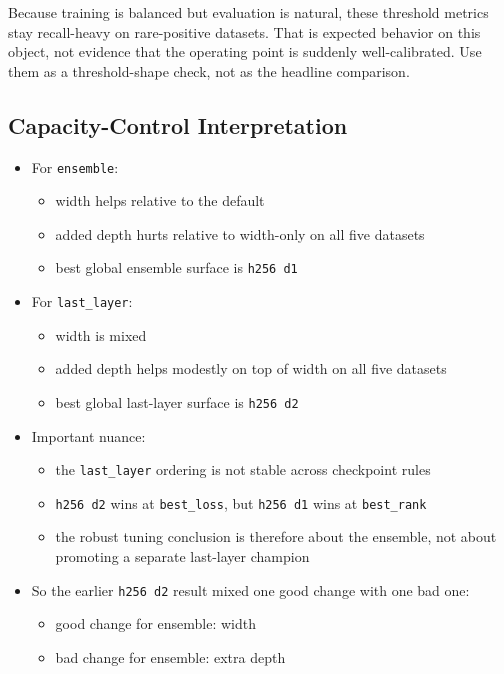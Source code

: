 \documentclass[11pt]{article}
\begin{document}
Because training is balanced but evaluation is natural, these threshold metrics stay recall-heavy on rare-positive datasets. That is expected behavior on this object, not evidence that the operating point is suddenly well-calibrated. Use them as a threshold-shape check, not as the headline comparison.

\subsection*{Capacity-Control Interpretation}
\begin{itemize}[leftmargin=1.5em]
\item For \texttt{ensemble}:
  \begin{itemize}[leftmargin=1.5em]
  \item width helps relative to the default
  \item added depth hurts relative to width-only on all five datasets
  \item best global ensemble surface is \texttt{h256 d1}
  \end{itemize}
\item For \texttt{last\_layer}:
  \begin{itemize}[leftmargin=1.5em]
  \item width is mixed
  \item added depth helps modestly on top of width on all five datasets
  \item best global last-layer surface is \texttt{h256 d2}
  \end{itemize}
\item Important nuance:
  \begin{itemize}[leftmargin=1.5em]
  \item the \texttt{last\_layer} ordering is not stable across checkpoint rules
  \item \texttt{h256 d2} wins at \texttt{best\_loss}, but \texttt{h256 d1} wins at \texttt{best\_rank}
  \item the robust tuning conclusion is therefore about the ensemble, not about promoting a separate last-layer champion
  \end{itemize}
\item So the earlier \texttt{h256 d2} result mixed one good change with one bad one:
  \begin{itemize}[leftmargin=1.5em]
  \item good change for ensemble: width
  \item bad change for ensemble: extra depth
  \end{itemize}
\end{itemize}
\end{document}

